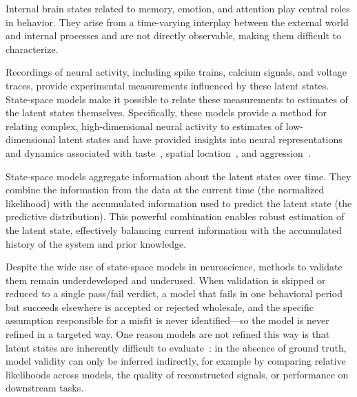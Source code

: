 \documentclass[12pt]{article}
\begin{document}
Internal brain states related to memory, emotion, and attention play central roles in behavior. They arise from a time-varying interplay between the external world and internal processes and are not directly observable, making them difficult to characterize.

Recordings of neural activity, including spike trains, calcium signals, and voltage traces, provide experimental measurements influenced by these latent states. State-space models make it possible to relate these measurements to estimates of the latent states themselves. Specifically, these models provide a method for relating complex, high-dimensional neural activity to estimates of low-dimensional latent states and have provided insights into neural representations and dynamics associated with taste~\cite{jonesNaturalStimuliEvoke2007}, spatial location~\cite{DenovellisHippocampalreplayexperience2021}, and aggression~\cite{vinogradCausalEvidenceLine2024}.

State-space models aggregate information about the latent states over time. They combine the information from the data at the current time (the normalized likelihood) with the accumulated information used to predict the latent state (the predictive distribution). This powerful combination enables robust estimation of the latent state, effectively balancing current information with the accumulated history of the system and prior knowledge.

Despite the wide use of state-space models in neuroscience, methods to validate them remain underdeveloped and underused. When validation is skipped or reduced to a single pass/fail verdict, a model that fails in one behavioral period but succeeds elsewhere is accepted or rejected wholesale, and the specific assumption responsible for a misfit is never identified---so the model is never refined in a targeted way. One reason models are not refined this way is that latent states are inherently difficult to evaluate~\cite{newmanModellingPopulationDynamics2014}: in the absence of ground truth, model validity can only be inferred indirectly, for example by comparing relative likelihoods across models, the quality of reconstructed signals, or performance on downstream tasks.
\end{document}
